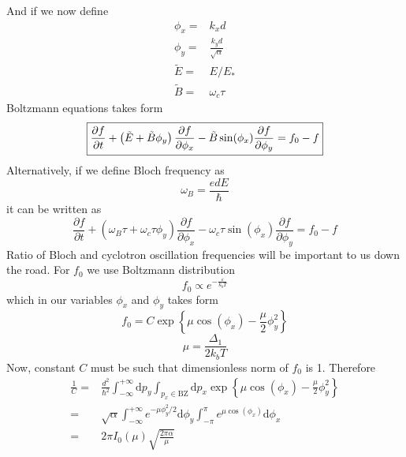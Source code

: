 \documentclass[40pt,letterpaper,physrev]{article}
\begin{document}
   And if we now define
   \begin{align}
       \phi_x=&k_{x}d \\
       \phi_y=&\frac{k_{y}d}{\sqrt{\alpha}} \\
       \tilde{E}=&E/E_*\\
       \tilde{B}=&\omega_{c}\tau
   \end{align}
   Boltzmann equations takes form
   \begin{equation}
   	\boxed{
   	\label{eq:boltzmann_final}
     \frac{\partial f}{\partial t}+
     \left ( \tilde{E}+\tilde{B}\phi_y\right ) \frac{\partial f}{\partial\phi_x}-
     \tilde{B}\sin(\phi_x)\frac{\partial f}{\partial\phi_y}
     = f_0 - f}
   \end{equation}
   Alternatively, if we define Bloch frequency as
   \begin{equation}
	\omega_B=\frac{edE}{\hbar}
   \end{equation}
   it can be written as 
   \begin{equation}
     \frac{\partial f}{\partial t}+
     \left ( \omega_B\tau+\omega_c\tau\phi_y\right ) \frac{\partial f}{\partial\phi_x}-
     \omega_c\tau\sin(\phi_x)\frac{\partial f}{\partial\phi_y}
     = f_0 - f
   \end{equation} 
    Ratio of Bloch and cyclotron oscillation frequencies will be important to us down the road.
    For $f_0$ we use Boltzmann distribution 
    \begin{equation}
        f_0\propto e^{\displaystyle -\frac{\varepsilon}{k_bT}}
    \end{equation}
    which in our variables $\phi_x$ and $\phi_y$ takes form
    \begin{equation}
	f_0=C\exp{\left \{ \mu\cos(\phi_x)-\frac{\mu}{2}\phi^2_y\right \} }
	\end{equation}
	\begin{equation}
	\boxed{\mu=\frac{\Delta_1}{2k_{b}T}}
    \end{equation} 
    Now, constant $C$ must be such that dimensionless norm of $f_0$ is 1. Therefore
    \begin{align}
       \frac{1}{C}=&\frac{d^2}
	{\hbar^2}\int^{+\infty}_{-\infty}\text{d}p_y\int_{p_x\in\text{BZ}}\text{d}p_x
	\exp{\left \{ \mu\cos(\phi_x)-\frac{\mu}{2}\phi^2_y\right \} } \\
	   =&\sqrt{\alpha}\int^{+\infty}_{-\infty}e^{-\mu\phi^2_y/2}\text{d}\phi_y
	   \int^{\pi}_{-\pi}e^{\mu\cos(\phi_x)}\text{d}\phi_x \\
	   =&2\pi I_0(\mu)\sqrt{\frac{2\pi\alpha}{\mu}}
    \end{align}
\end{document}
